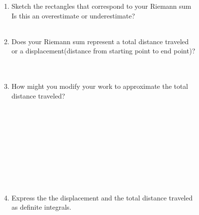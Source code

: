 \documentclass[12pt]{article}
\begin{document}
\begin{vwcol}[widths={0.4,0.6}, justify=flush, rule=0pt]
\begin{enumerate}
    \item Sketch the rectangles that correspond to your Riemann sum\\
    Is this an overestimate or underestimate?\\\\
    \item Does your Riemann sum represent a total distance traveled\\ or a displacement(distance from starting point to end point)?\\\\\\
    \item How might you modify your work to approximate the total\\ distance traveled?\\\\\\\\\\\\\\\\\\\\
    \item Express the the displacement and the total distance traveled\\ as definite integrals.
    \end{enumerate}
\end{vwcol} 
\newpage
\end{document}
